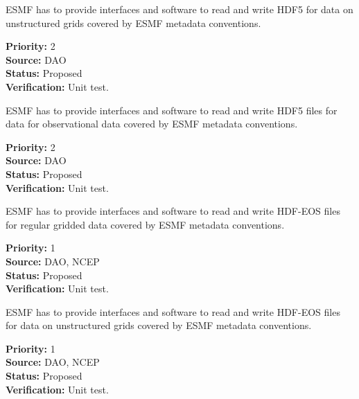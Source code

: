 
ESMF has to provide interfaces and software to read and write HDF5 for data 
on unstructured grids covered by ESMF metadata conventions.

\begin{reqlist}
{\bf Priority:} 2 \\
{\bf Source:} DAO \\
{\bf Status:} Proposed \\
{\bf Verification:} Unit test. 
\end{reqlist}



ESMF has to provide interfaces and software to read and write HDF5
files for data for observational data  covered by ESMF metadata conventions.

\begin{reqlist}
{\bf Priority:} 2 \\
{\bf Source:} DAO \\
{\bf Status:} Proposed \\
{\bf Verification:} Unit test. 
\end{reqlist}




ESMF has to provide interfaces and software to read and write HDF-EOS
files for regular gridded data covered by ESMF metadata conventions.


\begin{reqlist}
{\bf Priority:} 1 \\
{\bf Source:} DAO, NCEP \\
{\bf Status:} Proposed \\
{\bf Verification:} Unit test. \\
\end{reqlist}



ESMF has to provide interfaces and software to read and write HDF-EOS
files for data on unstructured grids covered by ESMF metadata conventions.


\begin{reqlist}
{\bf Priority:} 1 \\
{\bf Source:} DAO, NCEP \\
{\bf Status:} Proposed \\
{\bf Verification:} Unit test. \\
\end{reqlist}


